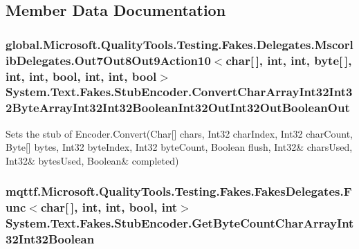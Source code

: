 \subsection{Member Data Documentation}
\hypertarget{class_system_1_1_text_1_1_fakes_1_1_stub_encoder_a08bbc1bdf8c92f73247ffce1cda6fb8b}{
\subsubsection[{Convert\-Char\-Array\-Int32\-Int32\-Byte\-Array\-Int32\-Int32\-Boolean\-Int32\-Out\-Int32\-Out\-Boolean\-Out}]{\setlength{\rightskip}{0pt plus 5cm}global.\-Microsoft.\-Quality\-Tools.\-Testing.\-Fakes.\-Delegates.\-Mscorlib\-Delegates.\-Out7\-Out8\-Out9\-Action10$<$char\mbox{[}$\,$\mbox{]}, int, int, byte\mbox{[}$\,$\mbox{]}, int, int, bool, int, int, bool$>$ System.\-Text.\-Fakes.\-Stub\-Encoder.\-Convert\-Char\-Array\-Int32\-Int32\-Byte\-Array\-Int32\-Int32\-Boolean\-Int32\-Out\-Int32\-Out\-Boolean\-Out}}\label{class_system_1_1_text_1_1_fakes_1_1_stub_encoder_a08bbc1bdf8c92f73247ffce1cda6fb8b}


Sets the stub of Encoder.\-Convert(Char\mbox{[}\mbox{]} chars, Int32 char\-Index, Int32 char\-Count, Byte\mbox{[}\mbox{]} bytes, Int32 byte\-Index, Int32 byte\-Count, Boolean flush, Int32\& chars\-Used, Int32\& bytes\-Used, Boolean\& completed)

\hypertarget{class_system_1_1_text_1_1_fakes_1_1_stub_encoder_ab73a2811685408b1b05e3125d9092455}{
\subsubsection[{Get\-Byte\-Count\-Char\-Array\-Int32\-Int32\-Boolean}]{\setlength{\rightskip}{0pt plus 5cm}mqttf.\-Microsoft.\-Quality\-Tools.\-Testing.\-Fakes.\-Fakes\-Delegates.\-Func$<$char\mbox{[}$\,$\mbox{]}, int, int, bool, int$>$ System.\-Text.\-Fakes.\-Stub\-Encoder.\-Get\-Byte\-Count\-Char\-Array\-Int32\-Int32\-Boolean}}\label{class_system_1_1_text_1_1_fakes_1_1_stub_encoder_ab73a2811685408b1b05e3125d9092455}



